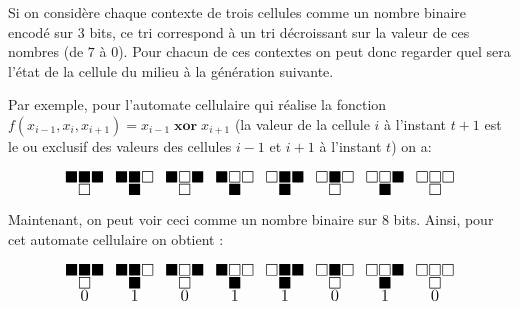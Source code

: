 Si on considère chaque contexte de trois cellules comme un nombre binaire encodé sur 3 bits, ce tri correspond
à un tri décroissant sur la
valeur de ces nombres (de $7$ à $0$). Pour  chacun de ces contextes on peut donc regarder  quel sera l'état
de la cellule du milieu à la génération suivante.

Par exemple, pour l'automate cellulaire qui réalise la
fonction $f(x_{i-1}, x_i, x_{i+1}) = x_{i-1} \; \mathbf{xor} \; x_{i+1}$ (la valeur de la cellule $i$ à l'instant $t+1$ est le ou exclusif des valeurs des cellules $i-1$ et $i+1$ à l'instant $t$) on a:


\[ \LARGE
	\substack{\blacksquare \blacksquare \blacksquare \\ \square } \enspace
	\substack{\blacksquare \blacksquare \square \\ \blacksquare} \enspace
	\substack{\blacksquare \square \blacksquare \\ \square} \enspace
	\substack{\blacksquare \square \square \\ \blacksquare} \enspace
	\substack{\square \blacksquare \blacksquare \\ \blacksquare} \enspace
	\substack{\square \blacksquare \square \\ \square} \enspace
	\substack{\square \square \blacksquare \\ \blacksquare} \enspace
	\substack{\square \square \square \\ \square}
\]

Maintenant, on peut voir ceci comme un nombre binaire sur 8 bits. Ainsi, pour cet automate cellulaire on obtient :



\[ \LARGE
	\substack{\blacksquare \blacksquare \blacksquare \\ \square \\ 0 } \enspace
	\substack{\blacksquare \blacksquare \square \\ \blacksquare \\ 1} \enspace
	\substack{\blacksquare \square \blacksquare \\ \square \\ 0} \enspace
	\substack{\blacksquare \square \square \\ \blacksquare \\ 1} \enspace
	\substack{\square \blacksquare \blacksquare \\ \blacksquare \\ 1} \enspace
	\substack{\square \blacksquare \square \\ \square \\ 0} \enspace
	\substack{\square \square \blacksquare \\ \blacksquare \\ 1} \enspace
	\substack{\square \square \square \\ \square \\ 0}
\]

